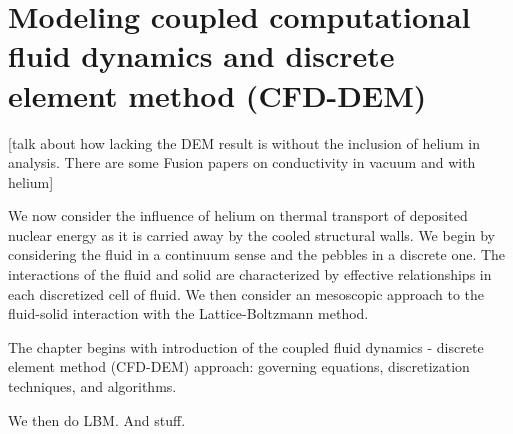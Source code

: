 \chapter{Modeling coupled computational fluid dynamics and discrete element method (CFD-DEM)} \label{sec:modeling-cfd-dem}
[talk about how lacking the DEM result is without the inclusion of helium in analysis. There are some Fusion papers on conductivity in vacuum and with helium]

We now consider the influence of helium on thermal transport of deposited nuclear energy as it is carried away by the cooled structural walls. We begin by considering the fluid in a continuum sense and the pebbles in a discrete one. The interactions of the fluid and solid are characterized by effective relationships in each discretized cell of fluid. We then consider an mesoscopic approach to the fluid-solid interaction with the Lattice-Boltzmann method. 

The chapter begins with introduction of the coupled fluid dynamics - discrete element method (CFD-DEM) approach: governing equations, discretization techniques, and algorithms.

We then do LBM. And stuff.



